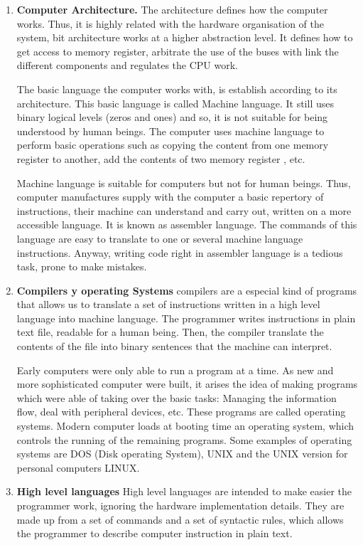 \begin{paracol}{2}
\begin{enumerate}
\item \textbf{Computer Architecture.} 
The architecture defines how the computer works. Thus, it is highly related with the hardware organisation of the system, bit architecture works at a higher abstraction level. It defines how to get access to memory register, arbitrate the use of the buses with link the different components and  regulates the CPU work.   
 
The basic language the computer works with, is establish according to its architecture. This basic language is called Machine language. It still uses binary logical levels (zeros and ones) and so, it is not suitable for being understood by human beings. The computer uses machine language to perform basic operations such as copying  the content from one memory register to another, add the contents of two memory register , etc.     

Machine language is suitable for computers but not for human beings. Thus, computer manufactures supply with the computer a basic repertory of instructions, their machine can understand and carry out, written on a more accessible language. It is known as assembler language. The commands of this language are easy to translate to one or several machine language instructions. Anyway, writing code right in assembler language is a tedious task, prone to make mistakes.     
   
\item \textbf{Compilers y operating Systems}  
compilers are a especial kind of programs that allows us to translate a set of instructions written in a high level language into machine language. The programmer writes instructions in plain text file, readable for a human being. Then, the compiler translate the contents of the file into binary sentences that the machine can interpret.
       
Early computers were only able to run a program at a time. As new and more sophisticated computer were built, it arises the idea of making programs which were able of taking over the basic tasks:
Managing the information flow, deal with peripheral devices, etc. These programs are called operating systems. Modern computer loads at booting time an operating system, which controls the running of the  remaining programs. Some examples of operating systems are DOS (Disk operating System), UNIX and the UNIX version for personal computers LINUX.       

\item \textbf{High level languages} 
High level languages are intended to make easier the programmer work, ignoring the hardware implementation details.   They are made up  from a set of commands and a set of syntactic rules, which allows the programmer to describe computer instruction in plain text.


\end{enumerate}
\end{paracol}
